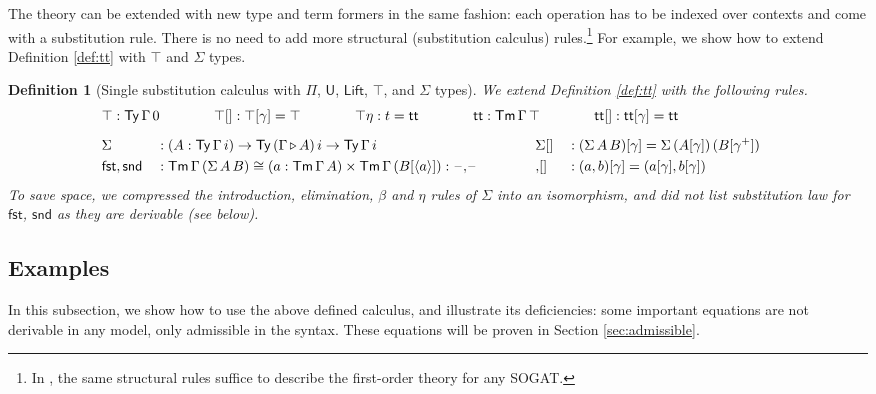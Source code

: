 \documentclass[submission,copyright,creativecommons]{eptcs}
\newtheorem{definition}[theorem]{Definition}
\newcommand{\ra}{\rightarrow}
\newcommand{\Ty}{\mathsf{Ty}}
\newcommand{\Tm}{\mathsf{Tm}}
\newcommand{\ext}{\mathop{\triangleright}}
\newcommand{\U}{\mathsf{U}}
\newcommand{\blank}{\mathord{\hspace{1pt}\text{--}\hspace{1pt}}} %
\renewcommand{\tt}{\mathsf{tt}}
\newcommand{\fst}{\mathsf{fst}}
\newcommand{\snd}{\mathsf{snd}}
\newcommand{\Lift}{\mathsf{Lift}}
\begin{document}
The theory can be extended with new type and term formers in the same
fashion: each operation has to be indexed over contexts and come
 with a substitution rule. There is no need to add more
structural (substitution calculus) rules.\footnote{In \cite{DBLP:conf/fscd/KaposiX24},
the same structural rules suffice to describe the first-order theory for any SOGAT.}
For example, we show how to
extend Definition \ref{def:tt} with $\top$ and $\Sigma$ types.
\begin{definition}[Single substitution calculus with $\Pi$, $\U$, $\Lift$, $\top$, and $\Sigma$ types]\label{def:sigma}
  We extend Definition \ref{def:tt} with the following rules.
  \begin{alignat*}{10}
    & \rlap{$
  \top : \Ty\,\Gamma\,0 \hspace{3.9em}
  \top[] : \top[\gamma] = \top\hspace{3.9em}
  \top\eta : t = \tt \hspace{3.9em}
  \tt : \Tm\,\Gamma\,\top \hspace{3.9em}
  \tt[] : \tt[\gamma] = \tt
      $} \\[0.5em]
    & \Sigma && : (A:\Ty\,\Gamma\,i)\ra\Ty\,(\Gamma\ext A)\,i\ra\Ty\,\Gamma\,i && \Sigma[] && : (\Sigma\,A\,B)[\gamma] = \Sigma\,(A[\gamma])\,(B[\gamma^+]) \\
    & \fst,\snd && : \Tm\,\Gamma\,(\Sigma\,A\,B)\cong(a:\Tm\,\Gamma\,A)\times\Tm\,\Gamma\,(B[\langle a\rangle]) : \blank{,}\blank \hspace{3.2em} && {,}[] && : (a,b)[\gamma] = (a[\gamma],b[\gamma])
  \end{alignat*}
  To save space, we compressed the introduction, elimination, $\beta$
  and $\eta$ rules of $\Sigma$ into an isomorphism, and did not list
  substitution law for $\fst$, $\snd$ as they are derivable (see
  below).
\end{definition}

\subsection{Examples}\label{sec:examples}

In this subsection, we show how to use the above defined calculus, and
illustrate its deficiencies: some important equations are not
derivable in any model, only admissible in the syntax. These equations
will be proven in Section \ref{sec:admissible}.
\end{document}
